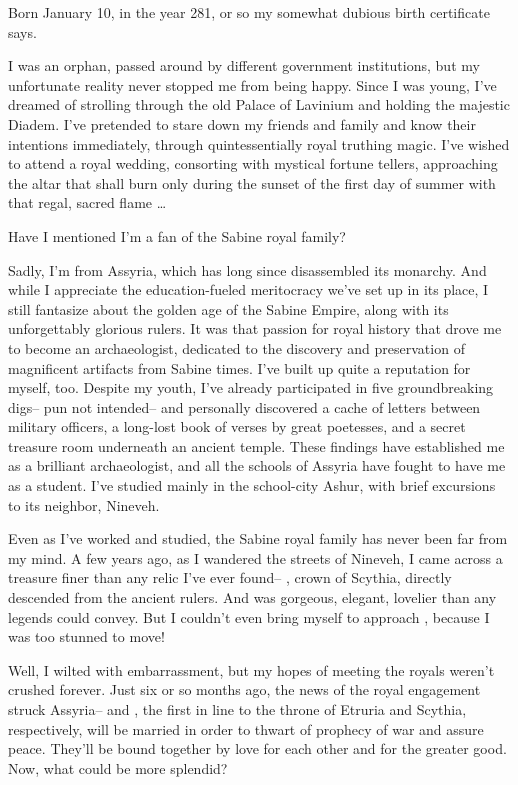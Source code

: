 \documentclass[char]{Kos}
\begin{document}
\name{\cArchaeologist{}}

Born January 10, in the year 281, or so my somewhat dubious birth certificate says.

I was an orphan, passed around by different government institutions, but my unfortunate reality never stopped me from being happy. Since I was young, I've dreamed of strolling through the old Palace of Lavinium and holding the majestic Diadem. I've pretended to stare down my friends and family and know their intentions immediately, through quintessentially royal truthing magic. I've wished to attend a royal wedding, consorting with mystical fortune tellers, approaching the altar that shall burn only during the sunset of the first day of summer with that regal, sacred flame \ldots{}

Have I mentioned I'm a fan of the Sabine royal family?

Sadly, I'm from Assyria, which has long since disassembled its monarchy. And while I appreciate the education-fueled meritocracy we've set up in its place, I still fantasize about the golden age of the Sabine Empire, along with its unforgettably glorious rulers. It was that passion for royal history that drove me to become an archaeologist, dedicated to the discovery and preservation of magnificent artifacts from Sabine times. I've built up quite a reputation for myself, too. Despite my youth, I've already participated in five groundbreaking digs-- pun not intended-- and personally discovered a cache of letters between military officers, a long-lost book of verses by great poetesses, and a secret treasure room underneath an ancient temple. These findings have established me as a brilliant archaeologist, and all the schools of Assyria have fought to have me as a student. I've studied mainly in the school-city Ashur, with brief excursions to its neighbor, Nineveh.

Even as I've worked and studied, the Sabine royal family has never been far from my mind. A few years ago, as I wandered the streets of Nineveh, I came across a treasure finer than any relic I've ever found-- \cBride{\intro}, crown \cBride{\prince} of Scythia, directly descended from the ancient rulers. And \cBride{\they} was gorgeous, elegant, lovelier than any legends could convey. But I couldn't even bring myself to approach \cBride{\them}, because I was too stunned to move!

Well, I wilted with embarrassment, but my hopes of meeting the royals weren't crushed forever. Just six or so months ago, the news of the royal engagement struck Assyria-- \cBride{} and \cGroom{}, the first in line to the throne of Etruria and Scythia, respectively, will be married in order to thwart of prophecy of war and assure peace. They'll be bound together by love for each other and for the greater good. Now, what could be more splendid?
\end{document}
